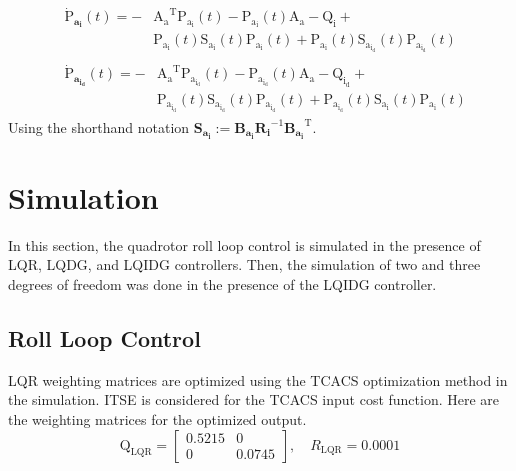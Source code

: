 \documentclass[conference]{IEEEtran}
\begin{document}
\begin{equation}\label{coupled_riccatti_LQIDG}
    \begin{split}
        &\begin{split}
            \boldsymbol{\dot{\mathrm{P}}_{a_i}}(t) = -&\boldsymbol{\mathrm{A_a}}^\mathrm{T}\boldsymbol{\mathrm{P_{a_i}}}(t) - \boldsymbol{\mathrm{P_{a_i}}}(t)\boldsymbol{\mathrm{A_a}} - \boldsymbol{\mathrm{Q_i}} +\\ &\boldsymbol{\mathrm{P_{a_i}}}(t)\boldsymbol{\mathrm{S_{a_i}}}(t)\boldsymbol{\mathrm{P_{a_i}}}(t) + \boldsymbol{\mathrm{P_{a_i}}}(t)\boldsymbol{\mathrm{S_{a_{i_d}}}}(t)\boldsymbol{\mathrm{P_{a_{i_d}}}}(t)
        \end{split}\\
        &\begin{split}
            \boldsymbol{\dot{\mathrm{P}}_{a_{i_d}}}(t) = -&\boldsymbol{\mathrm{A_a}}^\mathrm{T}\boldsymbol{\mathrm{P_{a_{i_d}}}}(t) - \boldsymbol{\mathrm{P_{a_{i_d}}}}(t)\boldsymbol{\mathrm{A_a}} - \boldsymbol{\mathrm{Q_{i_d}}} +\\ &\boldsymbol{\mathrm{P_{a_{i_d}}}}(t)\boldsymbol{\mathrm{S_{a_{i_d}}}}(t)\boldsymbol{\mathrm{P_{a_{i_d}}}}(t) + \boldsymbol{\mathrm{P_{a_{i_d}}}}(t)\boldsymbol{\mathrm{S_{a_i}}}(t)\boldsymbol{\mathrm{P_{a_i}}}(t)
        \end{split}
    \end{split}
\end{equation}
Using the shorthand notation $\boldsymbol{S_{a_i}} := \boldsymbol{B_{a_i}R_{i}}^{-1}\boldsymbol{B_{a_i}}^\mathrm{T}$. %




\section{Simulation}

In this section, the quadrotor roll loop control is simulated in the presence of LQR, LQDG, and LQIDG controllers. Then, the simulation of two and three degrees of freedom was done in the presence of the LQIDG controller.
\subsection{Roll Loop Control}

LQR weighting matrices are optimized using the TCACS optimization method in the simulation.
ITSE is considered for the TCACS input cost function.
Here are the weighting matrices for the optimized output.
\begin{equation}
	\boldsymbol{\mathrm{Q}}_{\text{LQR}} = \begin{bmatrix}
		0.5215 & 0\\
		0 & 0.0745
	\end{bmatrix}, \quad R_{\text{LQR}} =  0.0001
\end{equation} 
\end{document}
